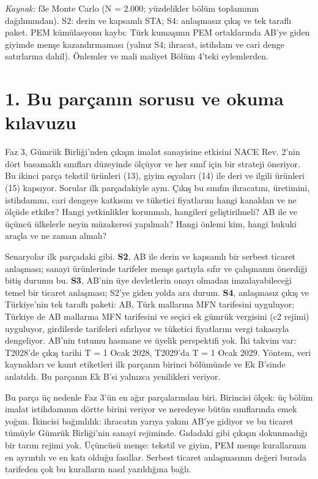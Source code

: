\emph{Kaynak:} \etiketT{} f3e Monte Carlo (N = 2.000; yüzdelikler bölüm toplamının dağılımından). S2: derin ve kapsamlı STA; S4: anlaşmasız çıkış ve tek taraflı paket. PEM kümülasyonu kaybı: Türk kumaşının PEM ortaklarında AB'ye giden giyimde menşe kazandırmaması (yalnız S4; ihracat, istihdam ve cari denge satırlarına dahil). Önlemler ve mali maliyet Bölüm 4'teki eylemlerden.

\hypertarget{nace_kartlar_13-15-1-bu-paruxe7anux131n-sorusu-ve-okuma-kux131lavuzu}{%
\section{1. Bu parçanın sorusu ve okuma kılavuzu}\label{nace_kartlar_13-15-1-bu-paruxe7anux131n-sorusu-ve-okuma-kux131lavuzu}}

Faz 3, Gümrük Birliği'nden çıkışın imalat sanayisine etkisini NACE Rev. 2'nin dört basamaklı sınıfları düzeyinde ölçüyor ve her sınıf için bir strateji öneriyor. Bu ikinci parça tekstil ürünleri (13), giyim eşyaları (14) ile deri ve ilgili ürünleri (15) kapsıyor. Sorular ilk parçadakiyle aynı. Çıkış bu sınıfın ihracatını, üretimini, istihdamını, cari dengeye katkısını ve tüketici fiyatlarını hangi kanaldan ve ne ölçüde etkiler? Hangi yetkinlikler korunmalı, hangileri geliştirilmeli? AB ile ve üçüncü ülkelerle neyin müzakeresi yapılmalı? Hangi önlemi kim, hangi hukuki araçla ve ne zaman almalı?

Senaryolar ilk parçadaki gibi. \textbf{S2}, AB ile derin ve kapsamlı bir serbest ticaret anlaşması; sanayi ürünlerinde tarifeler menşe şartıyla sıfır ve çalışmanın önerdiği bitiş durumu bu. \textbf{S3}, AB'nin üye devletlerin onayı olmadan imzalayabileceği temel bir ticaret anlaşması; S2'ye giden yolda ara durum. \textbf{S4}, anlaşmasız çıkış ve Türkiye'nin tek taraflı paketi: AB, Türk mallarına MFN tarifesini uyguluyor; Türkiye de AB mallarına MFN tarifesini ve seçici ek gümrük vergisini (c2 rejimi) uyguluyor, girdilerde tarifeleri sıfırlıyor ve tüketici fiyatlarını vergi takasıyla dengeliyor. AB'nin tutumu hasmane ve üyelik perspektifi yok. İki takvim var: T2028'de çıkış tarihi T = 1 Ocak 2028, T2029'da T = 1 Ocak 2029. Yöntem, veri kaynakları ve kanıt etiketleri ilk parçanın birinci bölümünde ve Ek B'sinde anlatıldı. Bu parçanın Ek B'si yalnızca yenilikleri veriyor.

Bu parça üç nedenle Faz 3'ün en ağır parçalarından biri. Birincisi ölçek: üç bölüm imalat istihdamının dörtte birini veriyor ve neredeyse bütün sınıflarında emek yoğun. İkincisi bağımlılık: ihracatın yarıya yakını AB'ye gidiyor ve bu ticaret tümüyle Gümrük Birliği'nin sanayi rejiminde. Gıdadaki gibi çıkışın dokunmadığı bir tarım rejimi yok. Üçüncüsü menşe: tekstil ve giyim, PEM menşe kurallarının en ayrıntılı ve en katı olduğu fasıllar. Serbest ticaret anlaşmasının değeri burada tarifeden çok bu kuralların nasıl yazıldığına bağlı.

